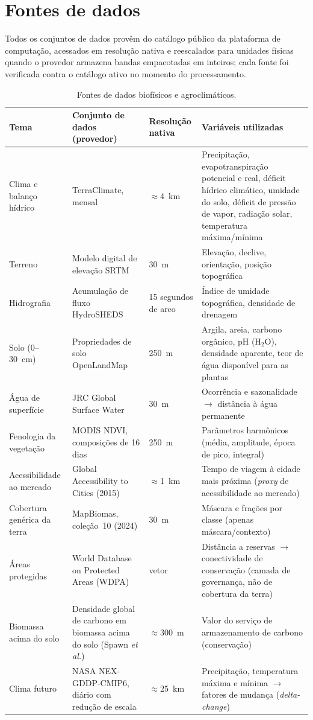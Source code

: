 \chapter{Fontes de dados}\label{anx:data}

Todos os conjuntos de dados provêm do catálogo público da plataforma de computação, acessados
em resolução nativa e reescalados para unidades físicas quando o provedor armazena bandas
empacotadas em inteiros; cada fonte foi verificada contra o catálogo ativo no momento do
processamento.

\begin{table}[H]
\centering
\caption{Fontes de dados biofísicos e agroclimáticos.}
\label{tab:src-biophys}
\begin{tabular}{@{}p{2.7cm}p{3.6cm}p{2cm}p{5.5cm}@{}}
\toprule
Tema & Conjunto de dados (provedor) & Resolução nativa & Variáveis utilizadas \\
\midrule
Clima e balanço hídrico & TerraClimate, mensal & $\approx$4~km & Precipitação,
  evapotranspiração potencial e real, déficit hídrico climático, umidade do solo, déficit de
  pressão de vapor, radiação solar, temperatura máxima/mínima \\
Terreno & Modelo digital de elevação SRTM & 30~m & Elevação, declive, orientação, posição
  topográfica \\
Hidrografia & Acumulação de fluxo HydroSHEDS & 15 segundos de arco & Índice de umidade
  topográfica, densidade de drenagem \\
Solo (0--30~cm) & Propriedades de solo OpenLandMap & 250~m & Argila, areia, carbono orgânico,
  pH (H$_2$O), densidade aparente, teor de água disponível para as plantas \\
Água de superfície & JRC Global Surface Water & 30~m & Ocorrência e sazonalidade
  $\rightarrow$ distância à água permanente \\
Fenologia da vegetação & MODIS NDVI, composições de 16 dias & 250~m & Parâmetros harmônicos
  (média, amplitude, época de pico, integral) \\
Acessibilidade ao mercado & Global Accessibility to Cities (2015) & $\approx$1~km & Tempo de
  viagem à cidade mais próxima (\emph{proxy} de acessibilidade ao mercado) \\
Cobertura genérica da terra & MapBiomas, coleção~10 (2024) & 30~m & Máscara e frações por classe
  (apenas máscara/contexto) \\
Áreas protegidas & World Database on Protected Areas (WDPA) & vetor & Distância a reservas
  $\rightarrow$ conectividade de conservação (camada de governança, não de cobertura da
  terra) \\
Biomassa acima do solo & Densidade global de carbono em biomassa acima do solo (Spawn
  \emph{et al.}) & $\approx$300~m & Valor do serviço de armazenamento de carbono
  (conservação) \\
Clima futuro & NASA NEX-GDDP-CMIP6, diário com redução de escala & $\approx$25~km &
  Precipitação, temperatura máxima e mínima $\rightarrow$ fatores de mudança
  (\emph{delta-change}) \\
\bottomrule
\end{tabular}
\end{table}

